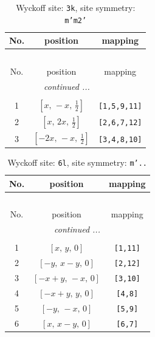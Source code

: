 \documentclass[fleqn,8pt]{jsarticle}
\begin{document}
\begin{longtable}{ccc}
\caption{Wyckoff site: {\tt 3k}, site symmetry: {\tt m'm2'}}
 \\
 \hline \hline
No. & position & mapping \\ \hline \endfirsthead

\multicolumn{2}{l}{\tablename\ \thetable{}} \\
 \hline \hline
No. & position & mapping \\ \hline \endhead

 \hline \hline
\multicolumn{2}{r}{\footnotesize\it continued ...} \\ \endfoot

 \hline \hline
\multicolumn{2}{r}{} \\ \endlastfoot

1 & $\left[ x,\, - x,\, \frac{1}{2} \right]$ & {\tt [1,5,9,11]} \\ \hline
2 & $\left[ x,\, 2 x,\, \frac{1}{2} \right]$ & {\tt [2,6,7,12]} \\ \hline
3 & $\left[ - 2 x,\, - x,\, \frac{1}{2} \right]$ & {\tt [3,4,8,10]} \\
\end{longtable}
\renewcommand{\arraystretch}{1.2}
\begin{longtable}{ccc}
\caption{Wyckoff site: {\tt 6l}, site symmetry: {\tt m'..}}
 \\
 \hline \hline
No. & position & mapping \\ \hline \endfirsthead

\multicolumn{2}{l}{\tablename\ \thetable{}} \\
 \hline \hline
No. & position & mapping \\ \hline \endhead

 \hline \hline
\multicolumn{2}{r}{\footnotesize\it continued ...} \\ \endfoot

 \hline \hline
\multicolumn{2}{r}{} \\ \endlastfoot

1 & $\left[ x,\, y,\, 0 \right]$ & {\tt [1,11]} \\ \hline
2 & $\left[ - y,\, x - y,\, 0 \right]$ & {\tt [2,12]} \\ \hline
3 & $\left[ - x + y,\, - x,\, 0 \right]$ & {\tt [3,10]} \\ \hline
4 & $\left[ - x + y,\, y,\, 0 \right]$ & {\tt [4,8]} \\ \hline
5 & $\left[ - y,\, - x,\, 0 \right]$ & {\tt [5,9]} \\ \hline
6 & $\left[ x,\, x - y,\, 0 \right]$ & {\tt [6,7]} \\
\end{longtable}
\end{document}
